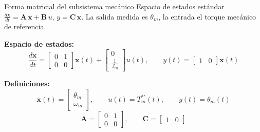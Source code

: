 \documentclass[aspectratio=169,t]{beamer}
\begin{document}
\begin{frame}{Forma matricial del subsistema mecánico}
{\small\color{uncGray}Espacio de estados estándar $\frac{d\bm{x}}{dt}=\bm{A}\,\bm{x}+\bm{B}\,u$, $y=\bm{C}\,\bm{x}$. La salida medida es $\theta_m$, la entrada el torque mecánico de referencia.}\par
\vspace{3mm}

\textbf{Espacio de estados:}
\begin{equation*}
\frac{d\bm{x}}{dt} =
\begin{bmatrix} 0 & 1 \\ 0 & 0 \end{bmatrix} \bm{x}(t) +
\begin{bmatrix} 0 \\ \tfrac{1}{J_{eq}} \end{bmatrix} u(t),
\qquad
y(t) = \begin{bmatrix} 1 & 0 \end{bmatrix} \bm{x}(t)
\end{equation*}

\textbf{Definiciones:}
\begin{equation*}
\bm{x}(t)=\begin{bmatrix} \theta_m \\ \omega_m \end{bmatrix},
\qquad
u(t)=T_m^{*\prime}(t),
\qquad
y(t)=\theta_m(t)
\end{equation*}
\begin{equation*}
\bm{A}=\begin{bmatrix} 0 & 1\\ 0 & 0 \end{bmatrix},
\qquad
\bm{C}=\begin{bmatrix} 1 & 0 \end{bmatrix}
\end{equation*}
\end{frame}
\end{document}
